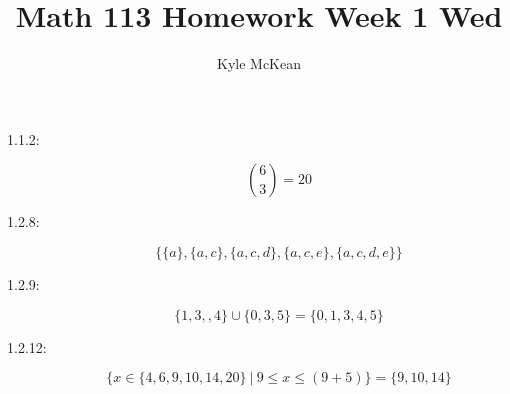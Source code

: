 \documentclass[11pt]{article}
\author{Kyle McKean}
\title{Math 113 Homework Week 1 Wed}
\begin{document}
\maketitle
\begin{description}
  \item[1.1.2:]
    \begin{equation}
      {6 \choose 3} = 20
    \end{equation}
  \item[1.2.8:]
    \begin{equation}
      \{ \{ a \}, \{ a, c \}, \{ a, c, d \}, \{ a, c, e \}, \{ a, c, d, e \} \}
    \end{equation}
  \item[1.2.9:]
    \begin{equation}
      \{ 1, 3, ,4\} \cup \{ 0, 3, 5\} = \{ 0, 1, 3, 4, 5 \}
    \end{equation}
  \item[1.2.12:]
    \begin{equation}
      \{ x \in \{ 4, 6, 9, 10, 14, 20 \} \ \vert \  9 \le x \le (9 + 5) \}
      =
      \{ 9, 10, 14 \}
    \end{equation}
\end{description} 
\end{document}

